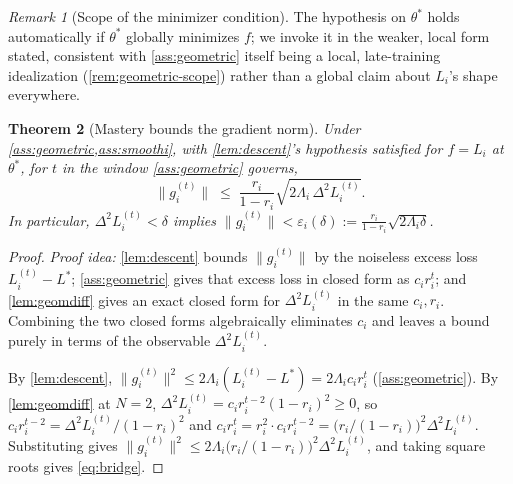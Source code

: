 \documentclass{article}
\theoremstyle{plain}
\newtheorem{theorem}{Theorem}[section]
\theoremstyle{definition}
\theoremstyle{remark}
\newtheorem{remark}[theorem]{Remark}
\begin{document}
\begin{remark}[Scope of the minimizer condition]
\label{rem:descent-scope}
The hypothesis on $\theta^*$ holds automatically if $\theta^*$ globally minimizes $f$; we invoke it in the weaker, local form stated, consistent with \cref{ass:geometric} itself being a local, late-training idealization (\cref{rem:geometric-scope}) rather than a global claim about $L_i$'s shape everywhere.
\end{remark}

\begin{theorem}[Mastery bounds the gradient norm]
\label{thm:bridge}
Under \cref{ass:geometric,ass:smoothi}, with \cref{lem:descent}'s hypothesis satisfied for $f=L_i$ at $\theta^*$, for $t$ in the window \cref{ass:geometric} governs,
\begin{equation}
\label{eq:bridge}
\|g_i^{(t)}\| \;\le\; \frac{r_i}{1-r_i}\sqrt{2\Lambda_i\,\Delta^2 L_i^{(t)}}.
\end{equation}
In particular, $\Delta^2 L_i^{(t)} < \delta$ implies $\|g_i^{(t)}\| < \varepsilon_i(\delta) := \frac{r_i}{1-r_i}\sqrt{2\Lambda_i\delta}$.
\end{theorem}
\begin{proof}
\emph{Proof idea:} \cref{lem:descent} bounds $\|g_i^{(t)}\|$ by the noiseless excess loss $L_i^{(t)}-L^*$; \cref{ass:geometric} gives that excess loss in closed form as $c_i r_i^t$; and \cref{lem:geomdiff} gives an exact closed form for $\Delta^2 L_i^{(t)}$ in the same $c_i,r_i$. Combining the two closed forms algebraically eliminates $c_i$ and leaves a bound purely in terms of the observable $\Delta^2 L_i^{(t)}$.

By \cref{lem:descent}, $\|g_i^{(t)}\|^2 \le 2\Lambda_i(L_i^{(t)}-L^*) = 2\Lambda_i c_i r_i^t$ (\cref{ass:geometric}). By \cref{lem:geomdiff} at $N=2$, $\Delta^2 L_i^{(t)} = c_i r_i^{t-2}(1-r_i)^2 \ge 0$, so $c_i r_i^{t-2} = \Delta^2 L_i^{(t)}/(1-r_i)^2$ and $c_i r_i^t = r_i^2 \cdot c_i r_i^{t-2} = \big(r_i/(1-r_i)\big)^2 \Delta^2 L_i^{(t)}$. Substituting gives $\|g_i^{(t)}\|^2 \le 2\Lambda_i\big(r_i/(1-r_i)\big)^2\Delta^2 L_i^{(t)}$, and taking square roots gives \cref{eq:bridge}.
\end{proof}
\end{document}
